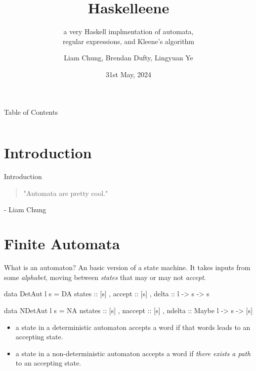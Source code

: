 \documentclass{beamer}
\title{Haskelleene}
\subtitle{a very Haskell implmentation of automata, \\ regular expressions, and Kleene's algorithm}
\author{Liam Chung, Brendan Dufty, Lingyuan Ye}
\date{31st May, 2024}
\begin{document}
\frame{\titlepage}

\begin{frame}{Table of Contents}
\begin{columns}[t]
 \begin{column}{.5\textwidth}
     \tableofcontents[sections={1-4}, hideallsubsections]
 \end{column}
 \begin{column}{.5\textwidth}
     \tableofcontents[sections={5-8}, hideallsubsections]
 \end{column}
\end{columns}
\end{frame}

\section{Introduction}
\begin{frame}{Introduction}
    \begin{quote}
        "Automata are pretty cool."
    \end{quote}
    - Liam Chung
\end{frame}

\section{Finite Automata}
\begin{frame}[fragile]{What is an automaton?}
An basic version of a state machine. It takes inputs from some \emph{alphabet}, moving between \emph{states} that may or may not \emph{accept}. 
  \begin{code}
  data DetAut l s = DA { states :: [s]
                       , accept :: [s]
                       , delta  :: l -> s -> s }

  data NDetAut l s = NA { nstates :: [s]
                        , naccept :: [s]
                        , ndelta :: Maybe l -> s -> [s] }
\end{code}\pause
\begin{itemize}
\item a state in a deterministic automaton accepts a word if that words leads to an accepting state. \pause

\item a state in a non-deterministic automaton accepts a word if \emph{there exists a path} to an accepting state.

\end{itemize}
\end{frame}
\end{document}
